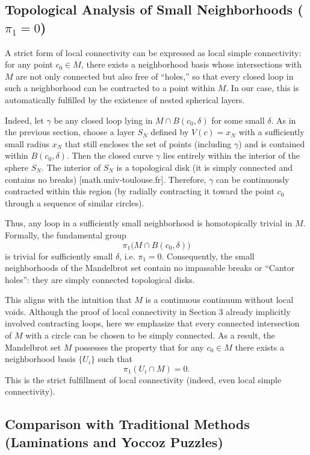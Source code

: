 \documentclass[12pt]{article}
\begin{document}
\subsection*{Topological Analysis of Small Neighborhoods (\(\pi_1 = 0\))}

A strict form of local connectivity can be expressed as local simple connectivity: for any point \(c_0 \in M\), there exists a neighborhood basis whose intersections with \(M\) are not only connected but also free of ``holes,'' so that every closed loop in such a neighborhood can be contracted to a point within \(M\). In our case, this is automatically fulfilled by the existence of nested spherical layers.

Indeed, let \(\gamma\) be any closed loop lying in \(M \cap B(c_0, \delta)\) for some small \(\delta\). As in the previous section, choose a layer \(S_N\) defined by \(V(c) = x_N\) with a sufficiently small radius \(x_N\) that still encloses the set of points (including \(\gamma\)) and is contained within \(B(c_0, \delta)\). Then the closed curve \(\gamma\) lies entirely within the interior of the sphere \(S_N\). The interior of \(S_N\) is a topological disk (it is simply connected and contains no breaks) [math.univ-toulouse.fr]. Therefore, \(\gamma\) can be continuously contracted within this region (by radially contracting it toward the point \(c_0\) through a sequence of similar circles).

Thus, any loop in a sufficiently small neighborhood is homotopically trivial in \(M\). Formally, the fundamental group
\[
\pi_1\bigl(M \cap B(c_0, \delta)\bigr)
\]
is trivial for sufficiently small \(\delta\), i.e. \(\pi_1 = 0\). Consequently, the small neighborhoods of the Mandelbrot set contain no impassable breaks or ``Cantor holes'': they are simply connected topological disks.

This aligns with the intuition that \(M\) is a continuous continuum without local voids. Although the proof of local connectivity in Section 3 already implicitly involved contracting loops, here we emphasize that every connected intersection of \(M\) with a circle can be chosen to be simply connected. As a result, the Mandelbrot set \(M\) possesses the property that for any \(c_0 \in M\) there exists a neighborhood basis \(\{U_i\}\) such that
\[
\pi_1(U_i \cap M) = 0.
\]
This is the strict fulfillment of local connectivity (indeed, even local simple connectivity).

\subsection*{Comparison with Traditional Methods (Laminations and Yoccoz Puzzles)}
\end{document}
